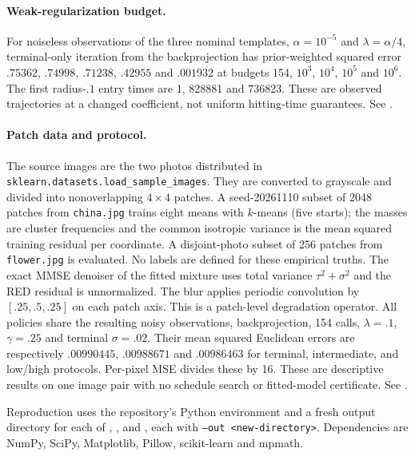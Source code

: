 \paragraph{Weak-regularization budget.}
For noiseless observations of the three nominal templates,
$\alpha=10^{-5}$ and $\lambda=\alpha/4$, terminal-only iteration
from the backprojection has prior-weighted squared error $.75362$,
$.74998$, $.71238$, $.42955$ and $.001932$ at budgets
154, $10^3$, $10^4$, $10^5$ and $10^6$.
The first radius-$.1$ entry times are 1, 828881 and 736823.
These are observed trajectories at a changed coefficient, not
uniform hitting-time guarantees. See
.

\paragraph{Patch data and protocol.}
The source images are the two photos distributed in
\texttt{sklearn.datasets.load\_sample\_images}.
They are converted to grayscale and divided into nonoverlapping
$4\times4$ patches. A seed-20261110 subset of 2048 patches from
\texttt{china.jpg} trains eight means with $k$-means (five starts);
the masses are cluster frequencies and the common isotropic variance
is the mean squared training residual per coordinate.
A disjoint-photo subset of 256 patches from \texttt{flower.jpg}
is evaluated. No labels are defined for these empirical truths.
The exact MMSE denoiser of the fitted mixture uses total variance
$\tau^2+\sigma^2$ and the RED residual is unnormalized.
The blur applies periodic convolution by $[.25,.5,.25]$ on each
patch axis. This is a patch-level degradation operator.
All policies share the resulting noisy observations, backprojection,
154 calls, $\lambda=.1$, $\gamma=.25$ and terminal $\sigma=.02$.
Their mean squared Euclidean errors are respectively $.00990445$,
$.00988671$ and $.00986463$ for terminal, intermediate, and low/high
protocols. Per-pixel MSE divides these by 16. These are descriptive
results on one image pair with no schedule search or fitted-model
certificate. See .

Reproduction uses the repository's Python environment and a fresh
output directory for each of
,
, and
, each with
\texttt{--out <new-directory>}. Dependencies are NumPy, SciPy,
Matplotlib, Pillow, scikit-learn and mpmath.
